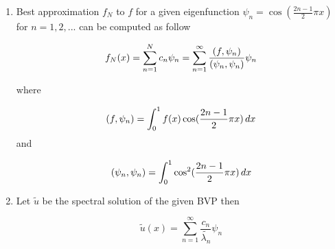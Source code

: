 {\begin{solution}
\begin{enumerate}
Finally we can show that the eigenfunctions of $\tilde{L}$  form a orthogonal set by showing 

\begin{eqnarray*}
\ip{\psi_j,\psi_k}&=& \int_0^1 \psi_j(x) \psi_k(x) \, dx , \quad j \neq k \\
\\
 								&=&	\int_0^1 \cos(\frac{2j-1}{2}\pi x)  \:  \cos(\frac{2k-1}{2}\pi x )  \, dx\\
 								\\
 								&=&	\frac{1}{2}\int_0^1 \cos((j+k-1)\pi x) +  \cos(( j-k) \pi x ) \, dx\\	
 								\\
            		&=&\frac{1}{2}\left[\frac{1}{(j+k-1)\pi} \sin((j+k-1)\pi x )+ \frac{1}{(j-k)\pi} \sin(( j-k) \pi x) \right]_0^1 \\
            		\\
 								&=&0 	\qquad \mbox{for} \:\:  i,j=1,2 \cdots 														
\end{eqnarray*}  

There is also another elegant way to show eigenfunctions are orthogonal to each other. Let $\tilde{\lambda_1}$ and $\tilde{\lambda_2} $  two distinct eigenvalues of corresponding eigenfunction $u$ and $v$.

\[
 							\ip{\tilde{L}u,v} = \ip{\lambda_1 u , v} = \lambda_1 \ip{u,v} 
\]
 Moreover 
 
 \[
 							\ip{u, \tilde{L}v} = \ip{ u , \lambda_2 v } = \lambda_2 \ip{u,v} 
\]

By symmetry we know $	\ip{\tilde{L}u,v} = 	\ip{u, \tilde{L}v} $. This is possible if and only if $\ip{u,v} = 0$.


\item Best approximation $f_N$ to $f$ for a given eigenfunction $\psi_n = \cos(\frac{2n-1}{2} \pi x) $ for $n=1,2, ...$ can be computed as follow 

\[
f_N(x) = \sum_{n=1}^{N} c_n \psi_n = \sum_{n=1}^{\infty} \frac{\left( f, \psi_n \right)}{\left( \psi_n, \psi_n \right)} \psi_n
\]

where

\[
\left( f, \psi_n \right) = \int_0^1 f(x) \cos(\frac{2n-1}{2} \pi x) \, dx
\]
and 

\[
\left( \psi_n, \psi_n \right) = \int_0^1  \cos^2 (\frac{2n-1}{2} \pi x) \, dx
\]

\item Let $\tilde{u}$ be the spectral solution of the given BVP then 


\[
\tilde{u}(x) = \sum_{n=1}^{\infty} \frac{c_n}{\tilde{\lambda_n}} \psi_n
\]


\end{enumerate}
\end{solution}}
